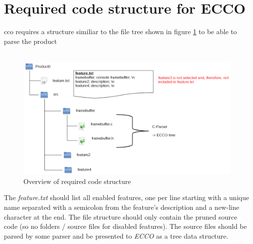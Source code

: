 \section{Required code structure for ECCO}
cco requires a structure similiar to the
file tree shown in figure \ref{fig:overview-2} to be able to parse the product
\\ \ \\
\begin{figure}[ht]
  \centering
  \includegraphics[scale=0.5]{images/overview-2}
  \caption{Overview of required code structure}
  \label{fig:overview-2}
\end{figure}

The {\it feature.txt} should list all enabled features,
one per line starting with a unique name separated with a semicolon from the feature's description 
and a new-line character at the end.
The file structure should only contain the pruned source code
(so no folders / source files for disabled features). 
The source files should be parsed by some parser and be presented to {\it ECCO} as a tree data structure.

\FloatBarrier
